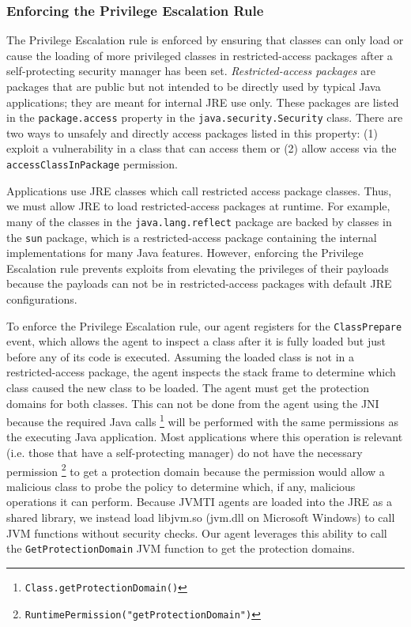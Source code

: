 \documentclass{sig-alternate}
\begin{document}
\subsubsection{Enforcing the Privilege Escalation Rule}\label{sub:Enforcing-the-Privilege}

The Privilege Escalation rule is enforced by ensuring that classes
can only load or cause the loading of more privileged classes in restricted-access
packages after a self-protecting security manager has been set. \textit{Restricted-access
packages} are packages that are public but not intended to be directly
used by typical Java applications; they are meant for internal JRE
use only. These packages are listed in the \texttt{package.access}
property in the \texttt{java.security.Security} class. There are two
ways to unsafely and directly access packages listed in this property:
(1) exploit a vulnerability in a class that can access them or (2)
allow access via the \texttt{accessClassInPackage} permission.

Applications use JRE classes which call restricted access package
classes. Thus, we must allow JRE to load restricted-access packages
at runtime. For example, many of the classes in the \texttt{java.lang.reflect}
package are backed by classes in the \texttt{sun} package, which is
a restricted-access package containing the internal implementations
for many Java features. However, enforcing the Privilege Escalation
rule prevents exploits from elevating the privileges of their payloads
because the payloads can not be in restricted-access packages with
default JRE configurations. 

To enforce the Privilege Escalation rule, our agent registers for
the \texttt{ClassPrepare} event, which allows the agent to inspect
a class after it is fully loaded but just before any of its code is
executed. Assuming the loaded class is not in a restricted-access
package, the agent inspects the stack frame to determine which class
caused the new class to be loaded. The agent must get the protection
domains for both classes. This can not be done from the agent using
the JNI because the required Java calls%
\footnote{\texttt{Class.getProtectionDomain()}%
} will be performed with the same permissions as the executing Java
application. Most applications where this operation is relevant (i.e.
those that have a self-protecting manager) do not have the necessary
permission%
\footnote{\texttt{RuntimePermission("getProtectionDomain")}%
} to get a protection domain because the permission would allow a malicious
class to probe the policy to determine which, if any, malicious operations
it can perform. Because JVMTI agents are loaded into the JRE as a
shared library, we instead load libjvm.so (jvm.dll on Microsoft Windows)
to call JVM functions without security checks. Our agent leverages
this ability to call the \texttt{GetProtectionDomain} JVM function
to get the protection domains. 
\end{document}
